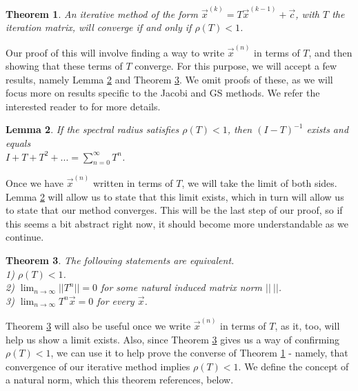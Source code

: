 \documentclass[12pt,letterpaper]{article}
\newtheorem{thm}{Theorem}[section]
\newtheorem{lem}[thm]{Lemma}
\theoremstyle{definition}
\begin{document}

\begin{thm}\label{rho(t) < 1}
An iterative method of the form $\vec{x}^{(k)} = T\vec{x}^{(k-1)} + \vec{c}$, with $T$ the iteration matrix, will converge if and only if $\rho(T) < 1$.
\end{thm}


\noindent Our proof of this will involve finding a way to write $\vec{x}^{(n)}$ in terms of $T$, and then showing that these terms of $T$ converge. For this purpose, we will accept a few results, namely Lemma \ref{lemma General Convergence Proof} and Theorem \ref{toinf, rho(A)<1}. We omit proofs of these, as we will focus more on results specific to the Jacobi and GS methods. We refer the interested reader to \cite{Keller} for more details.

\begin{lem}\label{lemma General Convergence Proof}
If the spectral radius satisfies $\rho(T) < 1$, then $(I-T)^{-1}$ exists and equals 
\\$I + T + T^{2} + ... = \sum_{n=0}^{\infty} T^{n}$.
\end{lem} 

Once we have $\vec{x}^{(n)}$ written in terms of $T$, we will take the limit of both sides. Lemma \ref{lemma General Convergence Proof} will allow us to state that this limit exists, which in turn will allow us to state that our method converges. This will be the last step of our proof, so if this seems a bit abstract right now, it should become more understandable as we continue.


\begin{thm}\label{toinf, rho(A)<1}
The following statements are equivalent.
\\1) $\rho{(T)}<1$.
\\2) $\lim_{n\to\infty} ||T^{n}|| = 0$ for some natural induced matrix norm $||\medspace||$.
\\3) $\lim_{n\to\infty}T^n\vec{x} = 0$ for every $\vec{x}$.
\end{thm}

Theorem \ref{toinf, rho(A)<1} will also be useful once we write $\vec{x}^{(n)}$ in terms of $T$, as it, too, will help us show a limit exists. Also, since Theorem \ref{toinf, rho(A)<1} gives us a way of confirming $\rho{(T)} < 1$, we can use it to help prove the converse of Theorem \ref{rho(t) < 1} - namely, that convergence of our iterative method implies $\rho{(T)} < 1$. We define the concept of a natural norm, which this theorem references, below.
\end{document}
